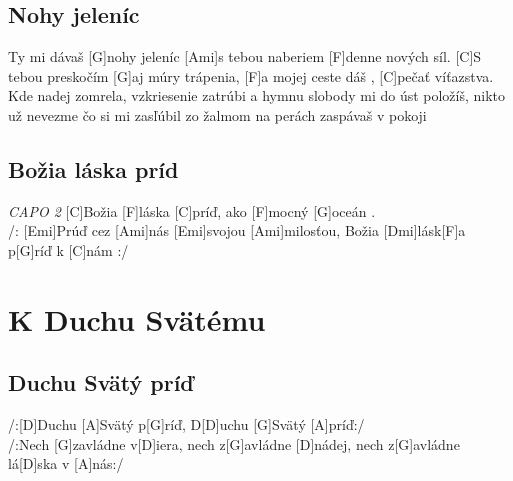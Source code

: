 \documentclass[10pt]{article}
\begin{document}
\begin{Large}
\begin{minipage}{\textwidth}
\subsection{Nohy jeleníc}
\begin{multicols}{2}
\begin{guitar}	
	[C]Ty mi dávaš [G]nohy jeleníc
	[Ami]s tebou naberiem [F]denne nových síl.
	[C]S tebou preskočím [G]aj múry trápenia,
	[F]a mojej ceste dáš , [C]pečať víťazstva.
	\\
	Kde nadej zomrela, vzkriesenie zatrúbi
	a hymnu slobody mi do úst položíš,
	nikto už nevezme čo si mi zasľúbil
	zo žalmom na perách zaspávaš v pokoji
\end{guitar}
\end{multicols}
\end{minipage}

\begin{minipage}{\textwidth}
\subsection{Božia láska príd}
\begin{guitar}
	\textit{CAPO 2}
	[C]Božia [F]láska [C]príď, ako [F]mocný [G]oceán .
	\\
	/: [Emi]Prúď cez [Ami]nás [Emi]svojou [Ami]milosťou, 
	Božia [Dmi]lásk[F]a p[G]ríď k [C]nám :/
\end{guitar}
\end{minipage}

\newpage
\section{K Duchu Svätému}

\begin{multicols}{2}
\begin{minipage}{\textwidth}
\subsection{Duchu Svätý príď}
\begin{guitar}
	/:[D]Duchu [A]Svätý p[G]ríď,
	D[D]uchu [G]Svätý [A]príď:/
	\\
	/:Nech [G]zavládne v[D]iera,
	nech z[G]avládne [D]nádej,
	nech z[G]avládne lá[D]ska v [A]nás:/
\end{guitar}
\end{minipage}

\begin{minipage}{\textwidth}

\end{minipage}
\end{multicols}
\end{Large}
\end{document}
